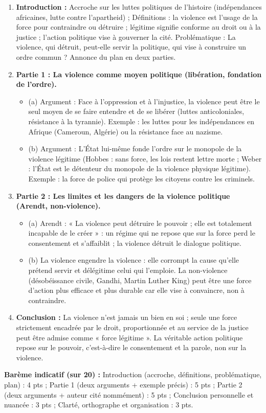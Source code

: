 \documentclass[11pt]{article}
\newcommand{\cle}[1]{{\popxbold\color{popdark}#1}}
\begin{document}
\begin{corrige}
\begin{enumerate}
\item \textbf{Introduction :} Accroche sur les luttes politiques de l'histoire (indépendances africaines, lutte contre l'apartheid) ; Définitions : la \cle{violence} est l'usage de la force pour contraindre ou détruire ; \cle{légitime} signifie conforme au droit ou à la justice ; l'\cle{action politique} vise à gouverner la cité. Problématique : La violence, qui détruit, peut-elle servir la politique, qui vise à construire un ordre commun ? Annonce du plan en deux parties.
\item \textbf{Partie 1 : La violence comme moyen politique (libération, fondation de l'ordre).}
\begin{itemize}
\item (a) Argument : Face à l'oppression et à l'injustice, la violence peut être le seul moyen de se faire entendre et de se libérer (luttes anticoloniales, résistance à la tyrannie). Exemple : les luttes pour les indépendances en Afrique (Cameroun, Algérie) ou la résistance face au nazisme.
\item (b) Argument : L'État lui-même fonde l'ordre sur le monopole de la violence légitime (Hobbes : sans force, les lois restent lettre morte ; Weber : l'État est le détenteur du monopole de la violence physique légitime). Exemple : la force de police qui protège les citoyens contre les criminels.
\end{itemize}
\item \textbf{Partie 2 : Les limites et les dangers de la violence politique (Arendt, non-violence).}
\begin{itemize}
\item (a) Arendt : « La violence peut détruire le pouvoir ; elle est totalement incapable de le créer » : un régime qui ne repose que sur la force perd le consentement et s'affaiblit ; la violence détruit le dialogue politique.
\item (b) La violence engendre la violence : elle corrompt la cause qu'elle prétend servir et délégitime celui qui l'emploie. La \cle{non-violence} (désobéissance civile, Gandhi, Martin Luther King) peut être une force d'action plus efficace et plus durable car elle vise à convaincre, non à contraindre.
\end{itemize}
\item \textbf{Conclusion :} La violence n'est jamais un bien en soi ; seule une force strictement encadrée par le droit, proportionnée et au service de la justice peut être admise comme « force légitime ». La véritable action politique repose sur le \cle{pouvoir}, c'est-à-dire le consentement et la parole, non sur la violence.
\end{enumerate}
\textbf{Barème indicatif (sur 20) :} Introduction (accroche, définitions, problématique, plan) : 4 pts ; Partie 1 (deux arguments + exemple précis) : 5 pts ; Partie 2 (deux arguments + auteur cité nommément) : 5 pts ; Conclusion personnelle et nuancée : 3 pts ; Clarté, orthographe et organisation : 3 pts.


\end{corrige}
\end{document}
